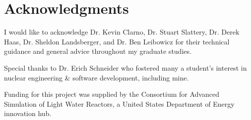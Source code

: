 
\section*{Acknowledgments}

I would like to acknowledge Dr. Kevin Clarno, Dr. Stuart Slattery, Dr. Derek Haas, Dr. Sheldon Landsberger, and Dr. Ben Leibowicz for their technical guidance and general advice throughout my graduate studies.

Special thanks to Dr. Erich Schneider who fostered many a student's interest in nuclear engineering \& software development, including mine.

Funding for this project was supplied by the Consortium for Advanced Simulation of Light Water Reactors, a United States Department of Energy innovation hub.

\newpage
